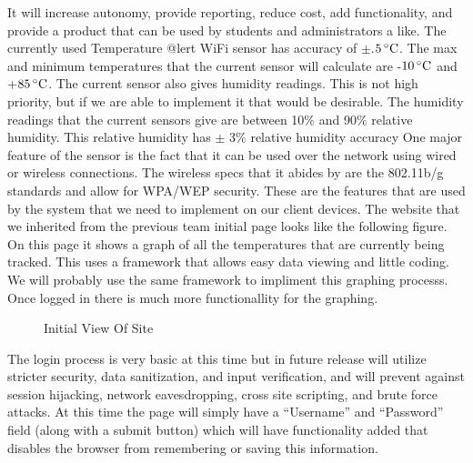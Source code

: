 \documentclass{report}
\begin{document}
It will increase autonomy, provide reporting, reduce cost, add functionality, and provide a product that can be used by students and administrators a like.
\newline
\indent
	The currently used Temperature @lert WiFi sensor has accuracy of $\pm$.$5\,^{\circ}{\rm C}$. The max and minimum temperatures that the current sensor will calculate are -$10\,^{\circ}{\rm C}$ and +$85\,^{\circ}{\rm C}$. 
The current sensor also gives humidity readings. 
This is not high priority, but if we are able to implement it that would be desirable.
 The humidity readings that the current sensors give are between 10$\%$ and 90$\%$ relative humidity. 
This relative humidity has $\pm$ 3$\%$ relative humidity accuracy One major feature of the sensor is the fact that it can be used over the network using wired or wireless connections. 
The wireless specs that it abides by are the 802.11b/g standards and allow for WPA/WEP security. 
These are the features that are used by the system that we need to implement on our client devices.
\newline
\indent
The website that we inherited from the previous team initial page looks like the following figure. 
On this page it shows a graph of all the temperatures that are currently being tracked. 
This uses a framework that allows easy data viewing and little coding. 
We will probably use the same framework to impliment this graphing processs. 
Once logged in there is much more functionallity for the graphing. 
\begin{figure}[H]
\caption{Initial View Of Site}
\end{figure}
\newpage
The login process is very basic at this time but in future release will utilize stricter security, data sanitization, and input verification, and will prevent against session hijacking, network eavesdropping, cross site scripting, and brute force attacks.  At this time the page will simply have a “Username” and “Password” field (along with a submit button) which will have functionality added that disables the browser from remembering or saving this information. 
\end{document}
